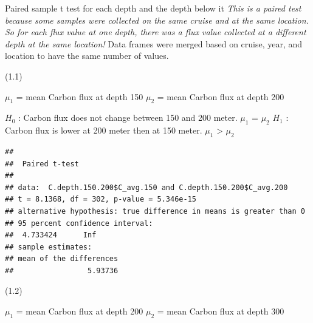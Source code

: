 \documentclass[]{article}
\newenvironment{Shaded}{\begin{snugshade}}{\end{snugshade}}
\newcommand{\DataTypeTok}[1]{\textcolor[rgb]{0.13,0.29,0.53}{#1}}
\newcommand{\FloatTok}[1]{\textcolor[rgb]{0.00,0.00,0.81}{#1}}
\newcommand{\KeywordTok}[1]{\textcolor[rgb]{0.13,0.29,0.53}{\textbf{#1}}}
\newcommand{\NormalTok}[1]{#1}
\newcommand{\OperatorTok}[1]{\textcolor[rgb]{0.81,0.36,0.00}{\textbf{#1}}}
\newcommand{\OtherTok}[1]{\textcolor[rgb]{0.56,0.35,0.01}{#1}}
\newcommand{\StringTok}[1]{\textcolor[rgb]{0.31,0.60,0.02}{#1}}
\begin{document}
Paired sample t test for each depth and the depth below it \emph{This is
a paired test because some samples were collected on the same cruise and
at the same location. So for each flux value at one depth, there was a
flux value collected at a different depth at the same location! } Data
frames were merged based on cruise, year, and location to have the same
number of values.

(1.1)

\(\mu_1\) = mean Carbon flux at depth 150 \(\mu_2\) = mean Carbon flux
at depth 200

\(H_0\) : Carbon flux does not change between 150 and 200 meter.
\(\mu_1\) = \(\mu_2\) \(H_1\) : Carbon flux is lower at 200 meter then
at 150 meter. \(\mu_1\) \textgreater{} \(\mu_2\)

\begin{Shaded}
\end{Shaded}

\begin{verbatim}
## 
##  Paired t-test
## 
## data:  C.depth.150.200$C_avg.150 and C.depth.150.200$C_avg.200
## t = 8.1368, df = 302, p-value = 5.346e-15
## alternative hypothesis: true difference in means is greater than 0
## 95 percent confidence interval:
##  4.733424      Inf
## sample estimates:
## mean of the differences 
##                 5.93736
\end{verbatim}

(1.2)

\(\mu_1\) = mean Carbon flux at depth 200 \(\mu_2\) = mean Carbon flux
at depth 300
\end{document}
